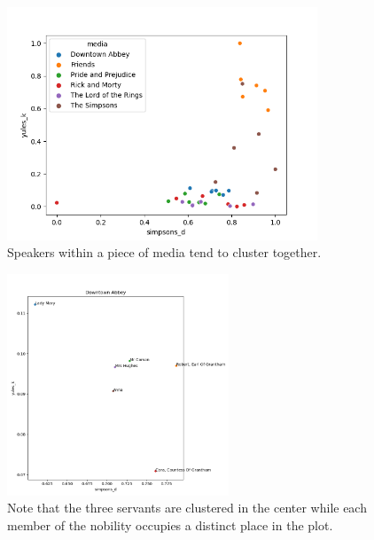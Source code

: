 \documentclass{article}
\newcommand{\largeimagewidth}{350}
\newcommand{\mediumimagewidth}{250}
\begin{document}
\begin{titlepage}
\begin{figure}[H]
\centering
\includegraphics[width=\largeimagewidth]{images/heuristics.png}
\caption{Speakers within a piece of media tend to cluster together.}
\end{figure}

\begin{figure}[H]
\centering
\includegraphics[width=\mediumimagewidth]{images/Downtown Abbey_heuristics.png}
\caption{Note that the three servants are clustered in the center while each member of the nobility occupies a distinct place in the plot.}
\end{figure}


\end{titlepage}
\end{document}
